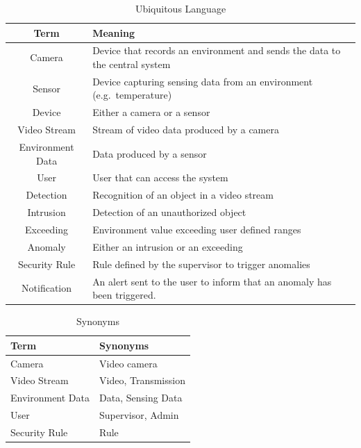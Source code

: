 \documentclass{scrartcl}
\begin{document}
    \renewcommand{\arraystretch}{1.5}
    \begin{table}
        \centering
        \begin{tabularx}{0.7\textwidth}{ | c | >{\centering\arraybackslash}X | }
            \hline
            \textbf{Term} & \textbf{Meaning} \\
            \hline
            Camera & Device that records an environment and sends the data to the central system \\
            \hline
            Sensor & Device capturing sensing data from an environment (e.g.\ temperature) \\
            \hline
            Device & Either a camera or a sensor \\
            \hline
            Video Stream & Stream of video data produced by a camera \\
            \hline
            Environment Data & Data produced by a sensor \\
            \hline
            User & User that can access the system \\
            \hline
            Detection & Recognition of an object in a video stream \\
            \hline
            Intrusion & Detection of an unauthorized object \\
            \hline
            Exceeding & Environment value exceeding user defined ranges \\
            \hline
            Anomaly & Either an intrusion or an exceeding \\
            \hline
            Security Rule & Rule defined by the supervisor to trigger anomalies \\
            \hline
            Notification & An alert sent to the user to inform that an anomaly has been triggered. \\
            \hline
        \end{tabularx}
        \caption{Ubiquitous Language}
        \label{tab:ubiquitous-language}
    \end{table}

    \renewcommand{\arraystretch}{1.8}
    \begin{table}
        \centering
        \begin{tabularx}{0.6\textwidth}{ | >{\centering\arraybackslash}X | >{\centering\arraybackslash}X | }
            \hline
            \textbf{Term} & \textbf{Synonyms} \\
            \hline
            Camera & Video camera \\
            \hline
            Video Stream & Video, Transmission \\
            \hline
            Environment Data & Data, Sensing Data \\
            \hline
            User & Supervisor, Admin \\
            \hline
            Security Rule & Rule \\
            \hline
        \end{tabularx}
        \caption{Synonyms}
        \label{tab:synonyms}
    \end{table}
\end{document}
